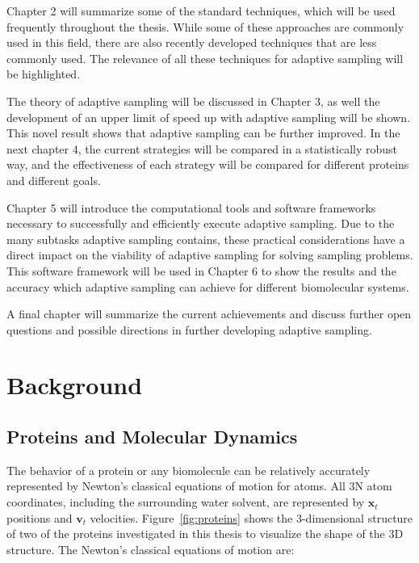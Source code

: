 Chapter 2 will summarize some of the standard techniques, which will be used frequently throughout the thesis. While some of these approaches are commonly used in this field, there are also recently developed techniques that are less commonly used. The relevance of all these techniques for adaptive sampling will be highlighted. 

The theory of adaptive sampling will be discussed in Chapter 3, as well the development of an upper limit of speed up with adaptive sampling will be shown. This novel result shows that adaptive sampling can be further improved. In the next chapter 4, the current strategies will be compared in a statistically robust way, and the effectiveness of each strategy will be compared for different proteins and different goals.

Chapter 5 will introduce the computational tools and software frameworks necessary to successfully and efficiently execute adaptive sampling. Due to the many subtasks adaptive sampling contains, these practical considerations have a direct impact on the viability of adaptive sampling for solving sampling problems. This software framework will be used in Chapter 6 to show the results and the accuracy which adaptive sampling can achieve for different biomolecular systems. 

A final chapter will summarize the current achievements and discuss further open questions and possible directions in further developing adaptive sampling.




\afterpage{\null\newpage}
\chapter{Background\label{sec:background}}

\section{Proteins and Molecular Dynamics}

The behavior of a protein or any biomolecule can be relatively accurately represented by Newton's classical equations of motion for atoms. All 3N atom coordinates, including the surrounding water solvent, are represented by $\mathbf{x}_{t}$ positions and $\mathbf{v}_{t}$ velocities. Figure~\ref{fig:proteins} shows the 3-dimensional structure of two of the proteins investigated in this thesis to visualize the shape of the 3D structure. The Newton's classical equations of motion are:

